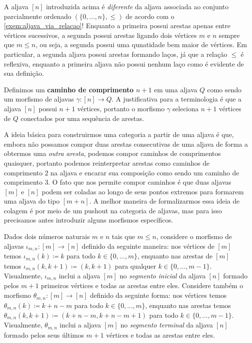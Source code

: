 \begin{obs}
    A aljava $[n]$ introduzida acima é \emph{diferente} da aljava associada ao conjunto parcialmente ordenado $(\{0,\dots,n\},\leq)$ de acordo com o \cref{exem:aljava_via_relacao}!
    Enquanto a primeira possui arestas apenas entre vértices sucessivos, a segunda possui arestas ligando dois vértices $m$ e $n$ sempre que $m \leq n$, ou seja, a segunda possui uma qunatidade bem maior de vértices.
    Em particular, a segunda aljava possui arestas formando laços, já que a relação $\leq$ é reflexiva, enquanto a primeira aljava não possui nenhum laço como é evidente de sua definição.
\end{obs}


Definimos um \textbf{caminho de comprimento $n+1$} em uma aljava $Q$ como sendo um morfismo de aljavas $\gamma: [n] \to Q$.
A justificativa para a terminologia é que a aljava $[n]$ possui $n+1$ vértices, portanto o morfismo $\gamma$ seleciona $n+1$ vértices de $Q$ conectados por uma sequência de arestas.

A ideia básica para construirmos uma categoria a partir de uma aljava é que, embora não possamos compor duas arestas consecutivas de uma aljava de forma a obtermos uma \emph{outra aresta}, podemos compor caminhos de comprimentos quaisquer, portanto podemos reinterpretar arestas como caminhos de comprimento $2$ na aljava e encarar sua composição como sendo um caminho de comprimento $3$.
O fato que nos permite compor caminhos é que duas aljavas $[m]$ e $[n]$ podem ser coladas ao longo de seus pontos extremos para formarem uma aljava do tipo $[m+n]$.
A melhor maneira de formalizarmos essa ideia de colagem é por meio de um pushout na categoria de aljavas, mas para isso precisamos antes introduzir alguns morfismos específicos.

Dados dois números naturais $m$ e $n$ tais que $m \leq n$, considere o morfismo de aljavas $\iota_{m,n}: [m] \to [n]$ definido da seguinte maneira: nos vértices de $[m]$ temos $\iota_{m,n}(k) \coloneqq k$ para todo $k \in \{0,\dots,m\}$, enquanto nas arestas de $[m]$ temos $\iota_{m,n}(k,k+1) \coloneqq (k,k+1)$ para qualquer $k \in \{0,\dots,m-1\}$.
Visualmente, $\iota_{m,n}$ inclui a aljava $[m]$ no \emph{segmento inicial} da aljava $[n]$ formado pelos $m+1$ primeiros vértices e todas as arestas entre eles.
Considere também o morfismo $\theta_{m,n}: [m] \to [n]$ definido da seguinte forma: nos vértices temos $\theta_{m,n}(k) \coloneqq k+n-m$ para todo $k \in \{0,\dots,m\}$, enquanto nas arestas temos $\theta_{m,n}(k,k+1) \coloneqq (k+n-m,k+n-m+1)$ para todo $k \in \{0,\dots,m-1\}$.
Visualmente, $\theta_{m,n}$ inclui a aljava $[m]$ no \emph{segmento terminal} da aljava $[n]$ formado pelos seus últimos $m+1$ vértices e todas as arestas entre eles.

